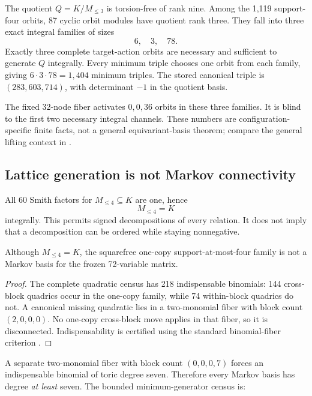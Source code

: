 The quotient \(Q=K/M_{\leq3}\) is torsion-free of rank nine.  Among the 1,119
support-four orbits, 87 cyclic orbit modules have quotient rank three.  They
fall into three exact integral families of sizes
\[
 6,\quad3,\quad78.
\]
Exactly three complete target-action orbits are necessary and sufficient to
generate \(Q\) integrally.  Every minimum triple chooses one orbit from each
family, giving \(6\cdot3\cdot78=1,404\) minimum triples.  The stored canonical
triple is \((283,603,714)\), with determinant \(-1\) in the quotient basis.

The fixed 32-node fiber activates \(0,0,36\) orbits in these three families.
It is blind to the first two necessary integral channels.  These numbers are
configuration-specific finite facts, not a general equivariant-basis
theorem; compare the general lifting context in
\cite{RauhSullivant2019}.

\subsection{Lattice generation is not Markov connectivity}

All 60 Smith factors for \(M_{\leq4}\subseteq K\) are one, hence
\[
 M_{\leq4}=K
\]
integrally.  This permits signed decompositions of every relation.  It does
not imply that a decomposition can be ordered while staying nonnegative.

\begin{proposition}\label{prop:p21-markov}
Although \(M_{\leq4}=K\), the squarefree one-copy support-at-most-four family
is not a Markov basis for the frozen 72-variable matrix.
\end{proposition}

\begin{proof}
The complete quadratic census has 218 indispensable binomials: 144
cross-block quadrics occur in the one-copy family, while 74 within-block
quadrics do not.  A canonical missing quadratic lies in a two-monomial fiber
with block count \((2,0,0,0)\).  No one-copy cross-block move applies in that
fiber, so it is disconnected.  Indispensability is certified using the
standard binomial-fiber criterion
\cite{AokiTakemuraYoshida2008,CharalambousThomaVladoiu2016}.
\end{proof}

A separate two-monomial fiber with block count \((0,0,0,7)\) forces an
indispensable binomial of toric degree seven.  Therefore every Markov basis
has degree \emph{at least} seven.  The bounded minimum-generator census is:

